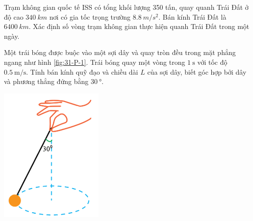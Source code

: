 \begin{ex}
Trạm không gian quốc tế ISS có tổng khối lượng 350 tấn, quay quanh Trái Đất ở độ cao $\SI{340}{km}$ nơi có gia tốc trọng trường $\SI{8,8}{m/s^2}$. Bán kính Trái Đất là $\SI{6400}{km}$. Xác định số vòng trạm không gian thực hiện quanh Trái Đất trong một ngày.	
\end{ex}
\begin{ex}
Một trái bóng được buộc vào một sợi dây và quay tròn đều trong mặt phẳng ngang như hình \ref{fig:31-P-1}. Trái bóng quay một vòng trong $\SI{1}{\second}$ với tốc độ $\SI{0.5}{\meter/\second}$. Tính bán kính quỹ đạo và chiều dài $L$ của sợi dây, biết góc hợp bởi dây và phương thẳng đứng bằng $\SI{30}{\degree}$.
\begin{center}
	\includegraphics[width=0.2\linewidth]{../figs/VN10-2023-PH-TP031-P-1}
	\label{fig:31-P-1}
\end{center}	
\end{ex}
